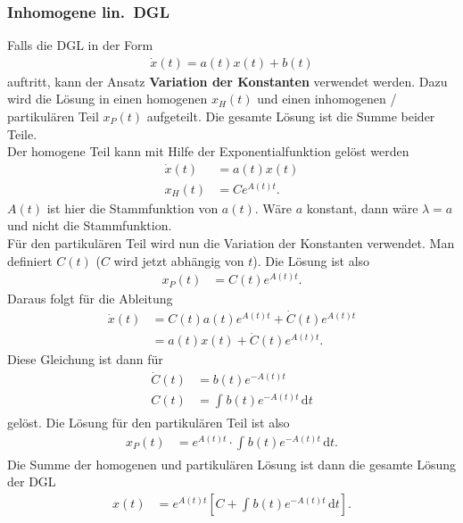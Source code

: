 \documentclass[a4paper,12pt]{article}
\newcommand{\td}{\,\text{d}}
\numberwithin{equation}{section}
\begin{document}
\subsubsection{Inhomogene lin.\ DGL}
Falls die DGL in der Form
\begin{align} 
        \dot{x}\left(t\right)=a\left(t\right)x\left(t\right)+b\left(t\right)
\end{align} 
auftritt, kann der Ansatz \textbf{Variation der Konstanten} verwendet werden. Dazu wird die Lösung in einen homogenen $x_H\left(t\right)$ und einen inhomogenen / partikulären Teil $x_{P}\left(t\right)$ aufgeteilt. Die gesamte Lösung ist die Summe beider Teile.\\\indent
Der homogene Teil kann mit Hilfe der Exponentialfunktion gelöst werden
\begin{align} 
        \dot{x}\left(t\right)&=a\left(t\right)x\left(t\right)\\
        x_H\left(t\right)&=Ce^{A\left(t\right)t}
.\end{align} 
$A\left(t\right)$ ist hier die Stammfunktion von $a\left(t\right)$. Wäre $a$ konstant, dann wäre $\lambda =a$ und nicht die Stammfunktion.\\\indent
Für den partikulären Teil wird nun die Variation der Konstanten verwendet. Man definiert $C\left(t\right)$ ($C$ wird jetzt abhängig von $t$). Die Lösung ist also
\begin{align} 
        x_P\left(t\right)&=C\left(t\right)e^{A\left(t\right)t}
.\end{align} 
Daraus folgt für die Ableitung
\begin{align} 
        \dot{x}\left(t\right)&=C\left(t\right)a\left(t\right)e^{A\left(t\right)t}+\dot{C}\left(t\right)e^{A\left(t\right)t}\\
                             &=a\left(t\right)x\left(t\right)+\dot{C}\left(t\right)e^{A\left(t\right)t}
.\end{align} 
Diese Gleichung ist dann für
\begin{align} 
        \dot{C}\left(t\right)&=b\left(t\right)e^{-A\left(t\right)t}\\
        C\left(t\right)&=\int_{}^{}b\left(t\right)e^{-A\left(t\right)t}\td t
\end{align} 
gelöst. Die Lösung für den partikulären Teil ist also
\begin{align} 
        x_{P}\left(t\right)&=e^{A\left(t\right)t}\cdot \int_{}^{}b\left(t\right)e^{-A\left(t\right)t}\td t
.\end{align} 
Die Summe der homogenen und partikulären Lösung ist dann die gesamte Lösung der DGL
\begin{align} 
        x\left(t\right)&=e^{A\left(t\right)t}\left[C+\int_{}^{}b\left(t\right)e^{-A\left(t\right)t}\td t\right]
.\end{align}
\end{document}
